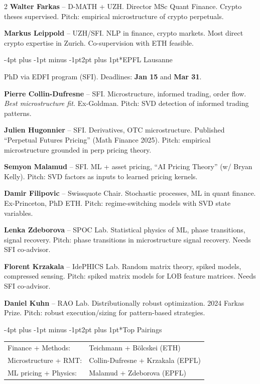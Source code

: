 \documentclass[9pt,a4paper]{article}
\makeatletter
\renewcommand\section{\@startsection{section}{1}{\z@}%
  {-4pt plus -1pt minus -1pt}{2pt plus 1pt}{\normalfont\normalsize\bfseries}}
\makeatother
\begin{document}
\begin{multicols}{2}
\textbf{Walter Farkas} -- D-MATH + UZH. Director MSc Quant Finance. Crypto theses supervised. Pitch: empirical microstructure of crypto perpetuals.

\textbf{Markus Leippold} -- UZH/SFI. NLP in finance, crypto markets. Most direct crypto expertise in Zurich. Co-supervision with ETH feasible.

\section*{EPFL Lausanne}

PhD via EDFI program (SFI). Deadlines: \textbf{Jan 15} and \textbf{Mar 31}.

\textbf{Pierre Collin-Dufresne} -- SFI. Microstructure, informed trading, order flow. \textit{Best microstructure fit.} Ex-Goldman. Pitch: SVD detection of informed trading patterns.

\textbf{Julien Hugonnier} -- SFI. Derivatives, OTC microstructure. Published ``Perpetual Futures Pricing'' (Math Finance 2025). Pitch: empirical microstructure grounded in perp pricing theory.

\textbf{Semyon Malamud} -- SFI. ML + asset pricing, ``AI Pricing Theory'' (w/ Bryan Kelly). Pitch: SVD factors as inputs to learned pricing kernels.

\textbf{Damir Filipovic} -- Swissquote Chair. Stochastic processes, ML in quant finance. Ex-Princeton, PhD ETH. Pitch: regime-switching models with SVD state variables.

\textbf{Lenka Zdeborova} -- SPOC Lab. Statistical physics of ML, phase transitions, signal recovery. Pitch: phase transitions in microstructure signal recovery. Needs SFI co-advisor.

\textbf{Florent Krzakala} -- IdePHICS Lab. Random matrix theory, spiked models, compressed sensing. Pitch: spiked matrix models for LOB feature matrices. Needs SFI co-advisor.

\textbf{Daniel Kuhn} -- RAO Lab. Distributionally robust optimization. 2024 Farkas Prize. Pitch: robust execution/sizing for pattern-based strategies.

\section*{Top Pairings}

\begin{tabular}{@{}ll@{}}
Finance + Methods: & Teichmann + B\"olcskei (ETH) \\
Microstructure + RMT: & Collin-Dufresne + Krzakala (EPFL) \\
ML pricing + Physics: & Malamud + Zdeborova (EPFL) \\
\end{tabular}


\end{multicols}
\end{document}
